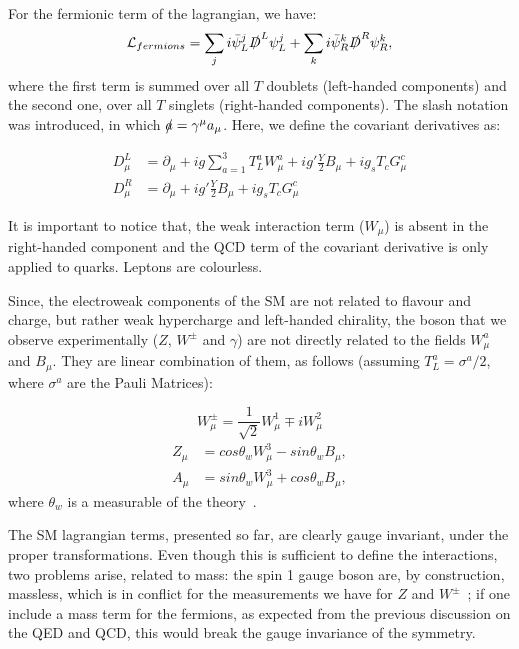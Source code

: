 For the fermionic term of the lagrangian, we have:
\begin{equation}
    \mathcal{L}_{fermions} = \sum_j i \bar{\psi}_L^j \slashed{D}^L \psi_L^j + \sum_k i \bar{\psi}_R^k \slashed{D}^R \psi_R^k,
\label{sm_lagrangian_fermionic}
\end{equation} 
where the first term is summed over all $T$ doublets (left-handed components) and the second one, over all $T$ singlets (right-handed components). The slash notation was introduced, in which $\slashed{a} = \gamma^\mu a_\mu$. Here, we define the covariant derivatives as:

\begin{equation}
    \begin{split}
        D_\mu^L &= \partial_\mu + ig \sum^3_{a=1} T_L^a W_\mu^a + ig'\frac{Y}{2}B_\mu + ig_sT_cG_\mu^c  \\
        D_\mu^R &= \partial_\mu + ig'\frac{Y}{2}B_\mu + ig_sT_cG_\mu^c 
    \end{split}
\label{electroweak_invariant_derivative}
\end{equation}

It is important to notice that, the weak interaction term ($W_\mu$) is absent in the right-handed component and the QCD term of the covariant derivative is only applied to quarks. Leptons are colourless.

Since, the electroweak components of the SM are not related to flavour and charge, but rather weak hypercharge and left-handed chirality, the boson that we observe experimentally ($Z$, $W^\pm$ and $\gamma$) are not directly related to the fields $W_\mu^a$ and $B_\mu$. They are linear combination of them, as follows (assuming $T_L^a = \sigma^a/2$, where $\sigma^a$ are the Pauli Matrices):

\begin{equation}
    W^{\pm}_\mu = \frac{1}{\sqrt{2}} W_\mu^1 \mp i W_\mu^2
\label{eletroweak_linear_combinations_W}
\end{equation}
\begin{equation}
    \begin{split}
        Z_\mu &= cos \theta_w W^3_\mu - sin \theta_w B_\mu, \\
        A_\mu &= sin \theta_w W^3_\mu + cos \theta_w B_\mu,
    \end{split}
\label{eletroweak_linear_combinations_z_gamma}
\end{equation}
where $\theta_w$ is a measurable of the theory~\cite{pdg_2020}.


The SM lagrangian terms, presented so far, are clearly gauge invariant, under the proper transformations. Even though this is sufficient to define the interactions, two problems arise, related to mass: the spin 1 gauge boson are, by construction, massless, which is in conflict for the measurements we have for $Z$ and $W^\pm$~\cite{pdg_2020}; if one include a mass term for the fermions, as expected from the previous discussion on the QED and QCD, this would break the gauge invariance of the symmetry.

